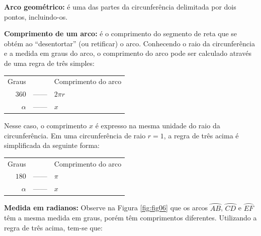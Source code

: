 \noindent
\textbf{Arco geométrico:} é uma das partes da circunferência delimitada por dois pontos, incluindo-os.

\noindent
\textbf{Comprimento de um arco:} é o comprimento do segmento de reta que se obtém ao “desentortar” (ou retificar) o arco. Conhecendo o raio da circunferência e a medida em graus do arco, o comprimento do arco pode ser calculado através de uma regra de três simples:\\

\begin{center}
\begin{tabular}{rcl}
Graus    &        & Comprimento do arco   \\
$360$    & ------ & $2 \pi r$      \\
$\alpha$ & ------ & $x$        \\
\end{tabular}
\end{center}

Nesse caso, o comprimento $x$ é expresso na mesma unidade do raio da circunferência. Em uma circunferência de raio $r=1$, a regra de três acima é simplificada da seguinte forma:

\begin{center}
\begin{tabular}{rcl}
Graus    &        & Comprimento do arco   \\
$180$    & ------ & $\pi$      \\
$\alpha$ & ------ & $x$        \\
\end{tabular}
\end{center}

\noindent
\textbf{Medida em radianos:} Observe na Figura \ref{fig:fig06} que os arcos $\wideparen{AB}$, $\wideparen{CD}$ e $\wideparen{EF}$ têm a mesma medida em graus, porém têm comprimentos diferentes. Utilizando a regra de três acima, tem-se que:

